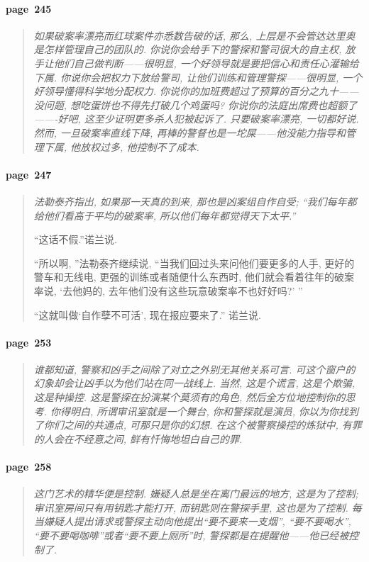 \paragraph*{page~245}
\begin{quotation}
    \itshape
    如果破案率漂亮而红球案件亦悉数告破的话, 那么, 上层是不会管达达里奥是怎样管理自己的团队的. 你说你会给手下的警探和警司很大的自主权, 放手让他们自己做判断------很明显, 一个好领导就是要把信心和责任心灌输给下属. 你说你会把权力下放给警司, 让他们训练和管理警探------很明显, 一个好领导懂得科学地分配权力. 你说你的加班费超过了预算的百分之九十------没问题, 想吃蛋饼也不得先打破几个鸡蛋吗? 你说你的法庭出席费也超额了-------好吧, 这至少证明更多杀人犯被起诉了. 只要破案率漂亮, 一切都好说. 然而, 一旦破案率直线下降, 再棒的警督也是一坨屎------他没能力指导和管理下属, 他放权过多, 他控制不了成本.  
\end{quotation}

\paragraph*{page~247}
\begin{quotation}
    \itshape
    法勒泰齐指出, 如果那一天真的到来, 那也是凶案组自作自受; ``我们每年都给他们看高于平均的破案率, 所以他们每年都觉得天下太平.''

    ``这话不假.''诺兰说.

    ``所以啊, ''法勒泰齐继续说, ``当我们回过头来问他们要更多的人手, 更好的警车和无线电, 更强的训练或者随便什么东西时, 他们就会看着往年的破案率说, `去他妈的, 去年他们没有这些玩意破案率不也好好吗?' ''

    ``这就叫做`自作孽不可活', 现在报应要来了.'' 诺兰说. 
\end{quotation}

\paragraph*{page~253}
\begin{quotation}
    \itshape
    谁都知道, 警察和凶手之间除了对立之外别无其他关系可言. 可这个窗户的幻象却会让凶手以为他们站在同一战线上. 当然, 这是个谎言, 这是个欺骗, 这是种操控. 这是警探在扮演某个莫须有的角色, 然后全方位地控制你的思考. 你得明白, 所谓审讯室就是一个舞台, 你和警探就是演员, 你以为你找到了你们之间的共通点, 可那只是你的幻想. 在这个被警察操控的炼狱中, 有罪的人会在不经意之间, 鲜有忏悔地坦白自己的罪.
\end{quotation}

\paragraph*{page~258}
\begin{quotation}
    \itshape
    这门艺术的精华便是控制. 嫌疑人总是坐在离门最远的地方, 这是为了控制; 审讯室房间只有用钥匙才能打开, 而钥匙则在警探手里, 这也是为了控制. 每当嫌疑人提出请求或警探主动向他提出``要不要来一支烟'', ``要不要喝水'', ``要不要喝咖啡''或者``要不要上厕所''时, 警探都是在提醒他------他已经被控制了. 
\end{quotation}

